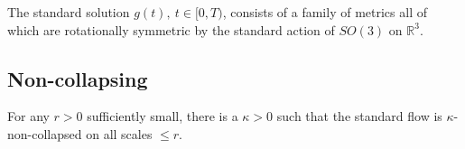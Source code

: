 \begin{corollary}
\label{cor:standard-solution-rotationally-symmetric}
The standard solution $g(t),\ t\in [0,T)$, consists of a family of metrics
all of which are
rotationally symmetric by the standard action of $SO(3)$ on
$\mathbb{R}^3$.
\end{corollary}










\subsection{Non-collapsing}



\begin{proposition}
\label{prop:standard-flow-kappa-noncollapsed}
\label{stdkappa}
For any $r>0$ sufficiently small, there is a $\kappa>0$ such that
the standard flow is $\kappa$-non-collapsed on all scales $\le r$.
\end{proposition}


